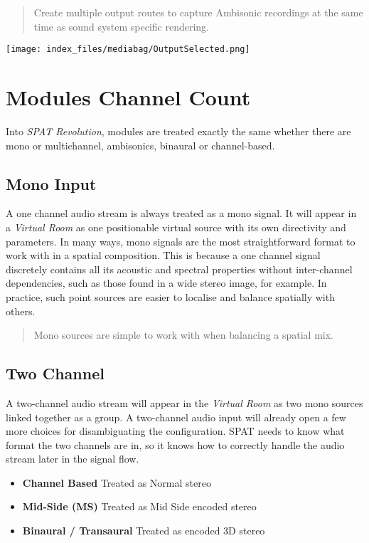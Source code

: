 \documentclass[
  letterpaper,
  DIV=11,
  numbers=noendperiod]{scrreport}
\providecommand{\tightlist}{%
  \setlength{\itemsep}{0pt}\setlength{\parskip}{0pt}}\usepackage{longtable,booktabs,array}
\begin{document}
\begin{quote}
Create multiple output routes to capture Ambisonic recordings at the
same time as sound system specific rendering.
\end{quote}

\texttt{[image: index\_files/mediabag/OutputSelected.png]}

\hypertarget{modules-channel-count}{%
\chapter{Modules Channel Count}\label{modules-channel-count}}

Into \emph{SPAT Revolution}, modules are treated exactly the same
whether there are mono or multichannel, ambisonics, binaural or
channel-based.

\hypertarget{mono-input}{%
\section{Mono Input}\label{mono-input}}

A one channel audio stream is always treated as a mono signal. It will
appear in a \emph{Virtual Room} as one positionable virtual source with
its own directivity and parameters. In many ways, mono signals are the
most straightforward format to work with in a spatial composition. This
is because a one channel signal discretely contains all its acoustic and
spectral properties without inter-channel dependencies, such as those
found in a wide stereo image, for example. In practice, such point
sources are easier to localise and balance spatially with others.

\begin{quote}
Mono sources are simple to work with when balancing a spatial mix.
\end{quote}

\hypertarget{two-channel}{%
\section{Two Channel}\label{two-channel}}

A two-channel audio stream will appear in the \emph{Virtual Room} as two
mono sources linked together as a group. A two-channel audio input will
already open a few more choices for disambiguating the configuration.
SPAT needs to know what format the two channels are in, so it knows how
to correctly handle the audio stream later in the signal flow.

\begin{itemize}
\tightlist
\item
  \textbf{Channel Based} Treated as Normal stereo
\item
  \textbf{Mid-Side (MS)} Treated as Mid Side encoded stereo
\item
  \textbf{Binaural / Transaural} Treated as encoded 3D stereo
\end{itemize}
\end{document}
